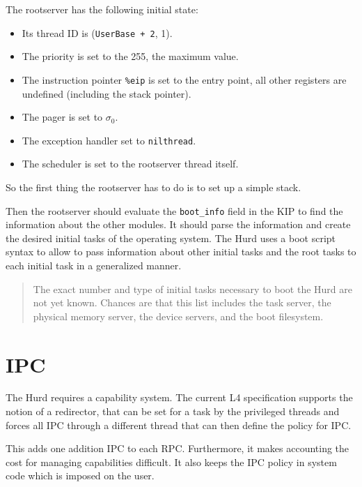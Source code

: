 \documentclass[9pt,a4paper]{extarticle}
\newenvironment{comment}{\footnotesize \begin{quote}}{\end{quote}}
\begin{document}
The rootserver has the following initial state:

\begin{itemize}
\item Its thread ID is (\verb/UserBase + 2/, 1).

\item The priority is set to the 255, the maximum value.

\item The instruction pointer \verb/%eip/ is set to the entry point,
all other registers are undefined (including the stack pointer).

\item The pager is set to $\sigma_0$.
  
\item The exception handler set to \verb/nilthread/.
  
\item The scheduler is set to the rootserver thread itself.
\end{itemize}

So the first thing the rootserver has to do is to set up a simple
stack.

Then the rootserver should evaluate the \verb/boot_info/ field in the
KIP to find the information about the other modules.  It should parse
the information and create the desired initial tasks of the operating
system.  The Hurd uses a boot script syntax to allow to pass
information about other initial tasks and the root tasks to each
initial task in a generalized manner.

\begin{comment}
  The exact number and type of initial tasks necessary
  to boot the Hurd are not yet known.  Chances are that this list
  includes the task server, the physical memory server, the device
  servers, and the boot filesystem.
\end{comment}


\section{IPC}

The Hurd requires a capability system.  The current L4 specification
supports the notion of a redirector, that can be set for a task by the
privileged threads and forces all IPC through a different thread that
can then define the policy for IPC.

This adds one addition IPC to each RPC.  Furthermore, it makes
accounting the cost for managing capabilities difficult.  It also
keeps the IPC policy in system code which is imposed on the user.
\end{document}
